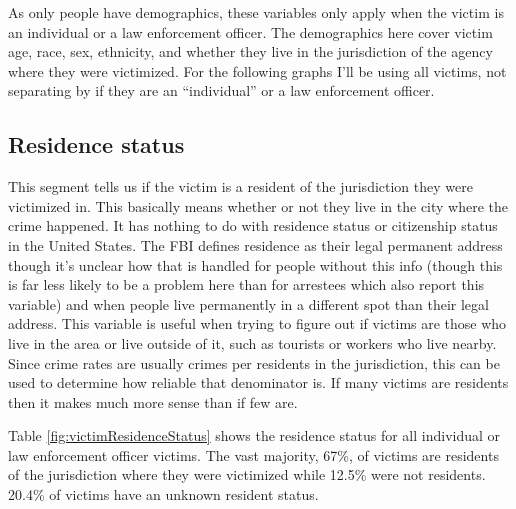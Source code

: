 \documentclass[
]{krantz}
\begin{document}
As only people have demographics, these variables only apply
when the victim is an individual or a law enforcement
officer. The demographics here cover victim age, race, sex,
ethnicity, and whether they live in the jurisdiction of the
agency where they were victimized. For the following graphs
I'll be using all victims, not separating by if they are an
``individual'' or a law enforcement officer.

\subsection{Residence status}\label{residence-status}

This segment tells us if the victim is a resident of the
jurisdiction they were victimized in. This basically means
whether or not they live in the city where the crime
happened. It has nothing to do with residence status or
citizenship status in the United States. The FBI defines
residence as their legal permanent address though it's
unclear how that is handled for people without this info
(though this is far less likely to be a problem here than
for arrestees which also report this variable) and when
people live permanently in a different spot than their legal
address. This variable is useful when trying to figure out
if victims are those who live in the area or live outside of
it, such as tourists or workers who live nearby. Since crime
rates are usually crimes per residents in the jurisdiction,
this can be used to determine how reliable that denominator
is. If many victims are residents then it makes much more
sense than if few are.

Table \ref{fig:victimResidenceStatus} shows the residence
status for all individual or law enforcement officer
victims. The vast majority, 67\%, of victims are residents
of the jurisdiction where they were victimized while 12.5\%
were not residents. 20.4\% of victims have an unknown
resident status.
\end{document}
